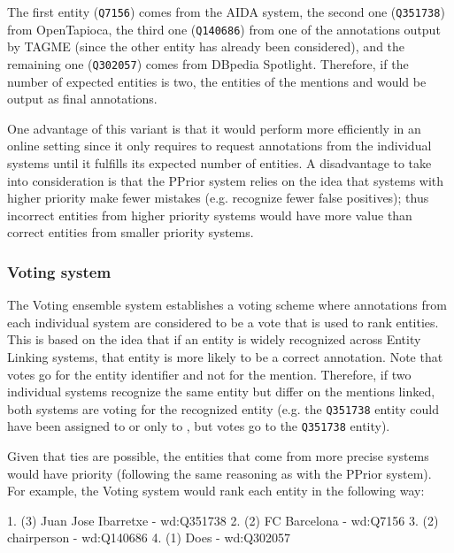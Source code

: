 The first entity (\texttt{Q7156}) comes from the AIDA system, the second one (\texttt{Q351738}) 
from OpenTapioca, the third one (\texttt{Q140686}) from one of the annotations output by 
TAGME (since the other entity has already been considered), and the remaining one (\texttt{Q302057}) 
comes from DBpedia Spotlight. Therefore, if the number of expected entities is two, the 
entities of the mentions  and  would be 
output as final annotations.

One advantage of this variant is that it would perform more efficiently in an online setting 
since it only requires to request annotations from the individual systems until it fulfills 
its expected number of entities. A disadvantage to take into consideration is that the PPrior 
system relies on the idea that systems with higher priority make fewer mistakes (e.g. 
recognize fewer false positives); thus incorrect entities from higher priority systems would 
have more value than correct entities from smaller priority systems.

\subsubsection{Voting system}
\label{cap3:system/entLinModule/ensembleSystems/voting}
The Voting ensemble system establishes a voting scheme where annotations from each individual 
system are considered to be a vote that is used to rank entities. This is based on the idea 
that if an entity is widely recognized across Entity Linking systems, that entity is more 
likely to be a correct annotation. Note that votes go for the entity identifier and not for 
the mention. Therefore, if two individual systems recognize the same entity but differ on the 
mentions linked, both systems are voting for the recognized entity (e.g. the \texttt{Q351738} 
entity could have been assigned to  or only to , 
but votes go to the \texttt{Q351738} entity).

Given that ties are possible, the entities that come from more precise systems would have priority 
(following the same reasoning as with the PPrior system). For example, the Voting system 
would rank each entity in the following way:

\begin{sparqlcode}[]
1. (3) Juan Jose Ibarretxe - wd:Q351738
2. (2) FC Barcelona - wd:Q7156
3. (2) chairperson - wd:Q140686
4. (1) Does - wd:Q302057
\end{sparqlcode}

